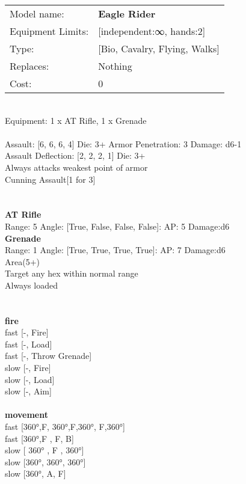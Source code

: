 \noindent
\begin{tabular}{ll}
Model name: &{\bf Eagle Rider } \\
Equipment Limits: &[independent:∞, hands:2] \\
Type: &[Bio, Cavalry, Flying, Walks] \\
Replaces: &Nothing \\
Cost: & 0\\
\end{tabular}
\ \\
Equipment: 1 x AT Rifle, 1 x Grenade \\
\ \\
Assault: [6, 6, 6, 4] Die: 3+ Armor Penetration: 3 Damage: d6-1 \\
Assault Deflection: [2, 2, 2, 1] Die: 3+\\
\indent Always attacks weakest point of armor\\ 
Cunning Assault[1 for 3]\\ 
 
\ \\

\ \\
{\bf AT Rifle } \\



Range: 5  Angle: [True, False, False, False]: AP: 5 Damage:d6 \\




{\bf Grenade } \\



Range: 1  Angle: [True, True, True, True]: AP: 7 Damage:d6 \\
Area(5+)\\ 
Target any hex within normal range\\ 
Always loaded\\ 




 
\ \\



\ \\ {\bf fire } \\
fast [-, Fire] \\
fast [-, Load] \\
fast [-, Throw Grenade] \\
slow [-, Fire] \\
slow [-, Load] \\
slow [-, Aim] \\
\ \\ {\bf movement } \\
fast [360°,F, 360°,F,360°, F,360°] \\
fast [360°,F , F, B] \\
slow [ 360° ,  F ,  360°] \\
slow [360°, 360°, 360°] \\
slow [360°, A, F] \\


